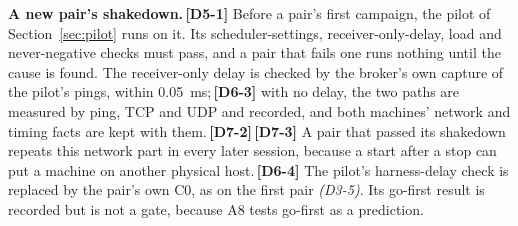 \documentclass[11pt]{article}
\newcommand{\gl}[1]{{\color{soft}\itshape\small (#1)}}
\newcommand{\chgold}[1]{\,{\color{oldcol}\bfseries\footnotesize[#1]}}
\begin{document}
\textbf{A new pair's shakedown.}\chgold{D5-1} Before a pair's first campaign, the pilot of Section~\ref{sec:pilot} runs on it. Its scheduler-settings, receiver-only-delay, load and never-negative checks must pass, and a pair that fails one runs nothing until the cause is found. The receiver-only delay is checked by the broker's own capture of the pilot's pings, within 0.05~ms;\chgold{D6-3} with no delay, the two paths are measured by ping, TCP and UDP and recorded, and both machines' network and timing facts are kept with them.\chgold{D7-2}\chgold{D7-3} A pair that passed its shakedown repeats this network part in every later session, because a start after a stop can put a machine on another physical host.\chgold{D6-4} The pilot's harness-delay check is replaced by the pair's own C0, as on the first pair \gl{D3-5}. Its go-first result is recorded but is not a gate, because A8 tests go-first as a prediction.
\end{document}

